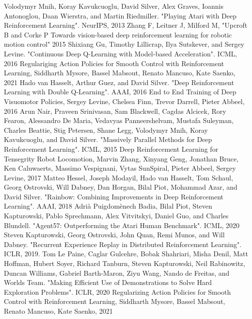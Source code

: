\documentclass[a4j, twocolumn, 10pt,pdflatex,ja=standard]{bxjsarticle}
\begin{document}
\begin{thebibliography}{99H}
 Volodymyr Mnih, Koray Kavukcuoglu, David Silver, Alex Graves, Ioannis Antonoglou, Daan Wierstra, and Martin Riedmiller. "Playing Atari with Deep Reinforcement Learning". NeurIPS, 2013
Zhang F, Leitner J, Milford M, "Upcroft B and Corke P Towards vision-based deep reinforcement learning for robotic motion control" 2015
 Shixiang Gu, Timothy Lillicrap, Ilya Sutskever, and Sergey Levine. "Continuous Deep Q-Learning with Model-based Acceleration". ICML, 2016
 Regulariging Action Policies for Smooth Control with Reinforcement Learning, Siddharth Mysore, Bassel Mabsout, Renato Mancuso, Kate Saenko, 2021
 Hado van Hasselt, Arthur Guez, and David Silver. "Deep Reinforcement Learning with Double Q-Learning". AAAI, 2016
 End to End Training of Deep Visuomotor Policies, Sergey Levine, Chelsea Finn, Trevor Darrell, Pieter Abbeel, 2016
Arun Nair, Praveen Srinivasan, Sam Blackwell, Cagdas Alcicek, Rory Fearon, Alessandro De Maria, Vedavyas Panneershelvam, Mustafa Suleyman, Charles Beattie, Stig Petersen, Shane Legg, Volodymyr Mnih, Koray Kavukcuoglu, and David Silver. "Massively Parallel Methods for Deep Reinforcement Learning". ICML, 2015
 Deep Reinforcement Learning for Tensegrity Robot Locomotion, Marvin Zhang, Xinyang Geng, Jonathan Bruce, Ken Caluwaerts, Massimo Vespignani, Vytas SunSpiral, Pieter Abbeel, Sergey Levine, 2017
 Matteo Hessel, Joseph Modayil, Hado van Hasselt, Tom Schaul, Georg Ostrovski, Will Dabney, Dan Horgan, Bilal Piot, Mohammad Azar, and David Silver. "Rainbow: Combining Improvements in Deep Reinforcement Learning". AAAI, 2018
 Adrià Puigdomènech Badia, Bilal Piot, Steven Kapturowski, Pablo Sprechmann, Alex Vitvitskyi, Daniel Guo, and Charles Blundell. "Agent57: Outperforming the Atari Human Benchmark". ICML, 2020
 Steven Kapturowski, Georg Ostrovski, John Quan, Remi Munos, and Will Dabney. "Recurrent Experience Replay in Distributed Reinforcement Learning". ICLR, 2019.
 Tom Le Paine, Caglar Gulcehre, Bobak Shahriari, Misha Denil, Matt Hoffman, Hubert Soyer, Richard Tanburn, Steven Kapturowski, Neil Rabinowitz, Duncan Williams, Gabriel Barth-Maron, Ziyu Wang, Nando de Freitas, and Worlds Team. "Making Efficient Use of Demonstrations to Solve Hard Exploration Problems". ICLR, 2020
 Regularizing Action Policies for Smooth Control with Reinforcement Learning, Siddharth Mysore, Bassel Mabsout, Renato Mancuso, Kate Saenko, 2021

\end{thebibliography}
\end{document}

